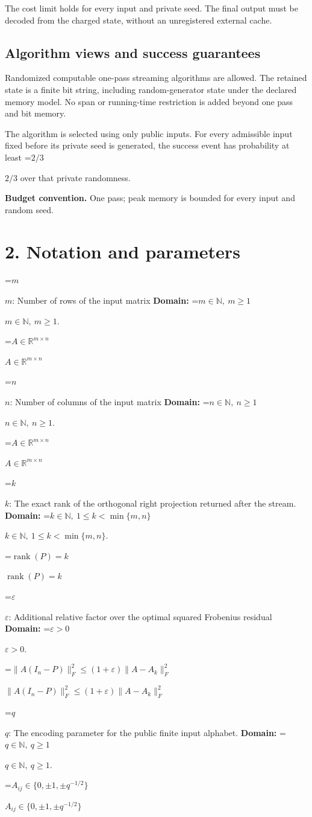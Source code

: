 \documentclass[10pt,a4paper]{article}
\newcommand{\AtlasMath}[1]{\par\begingroup\centering\setbox0=\hbox{$\displaystyle #1$}\ifdim\wd0>1.4\linewidth\typeout{ATLAS WIDE FORMULA: \the\wd0}\fi\ifdim\wd0>\linewidth\resizebox{\linewidth}{!}{\box0}\else\box0\fi\par\endgroup}
\newcommand{\AtlasInlineMath}[1]{\begingroup\setbox0=\hbox{$#1$}\ifdim\wd0>.4\linewidth\endgroup\AtlasMath{#1}\else\endgroup$#1$\fi}
\begin{document}
The cost limit holds for every input and private seed. The final output must be decoded from the charged state, without an unregistered external cache.

\subsection{Algorithm views and success guarantees}
Randomized computable one-pass streaming algorithms are allowed. The retained state is a finite bit string, including random-generator state under the declared memory model. No span or running-time restriction is added beyond one pass and bit memory.

The algorithm is selected using only public inputs. For every admissible input fixed before its private seed is generated, the success event has probability at least \AtlasInlineMath{2/3} over that private randomness.

\textbf{Budget convention.} One pass; peak memory is bounded for every input and random seed.

\section{2. Notation and parameters}
\AtlasInlineMath{m}: Number of rows of the input matrix \textbf{Domain:} \AtlasInlineMath{m\in\mathbb N,\ m\ge1}.

\AtlasInlineMath{A\in\mathbb R^{m\times n}}

\AtlasInlineMath{n}: Number of columns of the input matrix \textbf{Domain:} \AtlasInlineMath{n\in\mathbb N,\ n\ge1}.

\AtlasInlineMath{A\in\mathbb R^{m\times n}}

\AtlasInlineMath{k}: The exact rank of the orthogonal right projection returned after the stream. \textbf{Domain:} \AtlasInlineMath{k\in\mathbb N,\ 1\le k<\min\{m,n\}}.

\AtlasInlineMath{\operatorname{rank}(P)=k}

\AtlasInlineMath{\varepsilon}: Additional relative factor over the optimal squared Frobenius residual \textbf{Domain:} \AtlasInlineMath{\varepsilon>0}.

\AtlasInlineMath{\|A(I_n-P)\|_F^2\le(1+\varepsilon)\|A-A_k\|_F^2}

\AtlasInlineMath{q}: The encoding parameter for the public finite input alphabet. \textbf{Domain:} \AtlasInlineMath{q\in\mathbb N,\ q\ge1}.

\AtlasInlineMath{A_{ij}\in\{0,\pm1,\pm q^{-1/2}\}}
\end{document}
